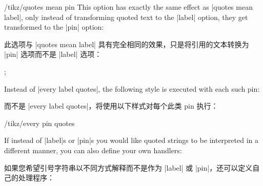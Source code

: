 \begin{key}{/tikz/quotes mean pin}
    This option has exactly the same effect as |quotes mean label|, only
    instead of transforming quoted text to the |label| option, they get
    transformed to the |pin| option:
    
    此选项与 |quotes mean label| 具有完全相同的效果，只是将引用的文本转换为 |pin| 选项而不是 |label| 选项：

\begin{codeexample}[preamble={\usetikzlibrary{quotes}}]
  ;
\end{codeexample}
    Instead of |every label quotes|, the following style is executed
    with each such pin:
    
    而不是 |every label quotes|，将使用以下样式对每个此类 pin 执行：

    \begin{stylekey}{/tikz/every pin quotes}
    \end{stylekey}
\end{key}

If instead of |label|s or |pin|s you would like quoted strings to be
interpreted in a different manner, you can also define your own handlers:

如果您希望引号字符串以不同方式解释而不是作为 |label| 或 |pin|，还可以定义自己的处理程序：


